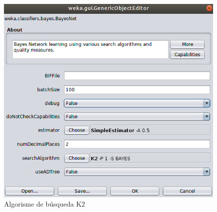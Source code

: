 \documentclass[11pt,a4paper]{article}
\begin{document}
\begin{figure}[hbtp]
\centering
\includegraphics[scale=0.38]{Figures/3.png}
\caption{Algorisme de búsqueda K2}
\end{figure}

\newpage
\end{document}
